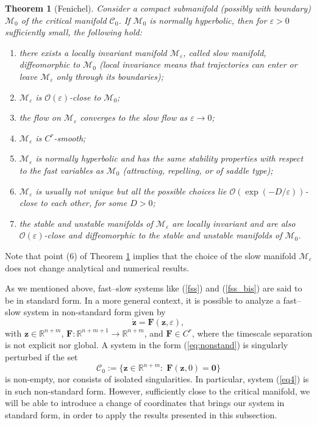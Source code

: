 \documentclass[11pt,reqno]{amsart}
\newtheorem{theorem}{Theorem}
\theoremstyle{boldremark}
\begin{document}
\begin{theorem}[Fenichel] \label{Fen}
    Consider a compact submanifold (possibly with boundary) $\mathcal{M}_0$ of the critical manifold $\mathcal{C}_0$. If $\mathcal{M}_0$ is normally hyperbolic, then for $\varepsilon>0$ sufficiently small, the following hold:
    \begin{enumerate}
        \item there exists a locally invariant manifold $\mathcal{M}_\varepsilon$, called slow manifold,  diffeomorphic to $\mathcal{M}_0$ (local invariance means that trajectories can enter or leave $\mathcal{M}_\varepsilon$ only through its boundaries); 
        \item $\mathcal{M}_\varepsilon$ is $\mathcal{O}(\varepsilon)$-close to $\mathcal{M}_0$; 
        \item the flow on $\mathcal{M}_\varepsilon$ converges to the slow flow as $\varepsilon \to 0$; 
        \item $\mathcal{M}_\varepsilon$ is $C^r$-smooth; 
        \item $\mathcal{M}_\varepsilon$ is normally hyperbolic and has the same stability properties with respect
        to the fast variables as $\mathcal{M}_0$ (attracting, repelling, or of saddle type); 
        \item $\mathcal{M}_\varepsilon$ is usually not unique but all the possible choices lie $\mathcal{O}(\exp(-D/\varepsilon))$-close to
        each other, for some $D > 0$; 
        \item the stable and unstable manifolds of $\mathcal{M}_\varepsilon$ are locally invariant and are also $\mathcal{O}(\varepsilon)$-close and diffeomorphic to the stable and unstable manifolds of $\mathcal{M}_0$. 
    \end{enumerate}
\end{theorem}

Note that point (6) of Theorem \ref{Fen} implies that the choice of the slow manifold $\mathcal{M}_\varepsilon$ does not change analytical and numerical results.

As we mentioned above, fast–slow systems like (\ref{fss}) and (\ref{fss_bis}) are said to be in standard form. In a more general context, it is possible
to analyze a fast–slow system in non-standard form given by \cite{0}
\begin{equation}\label{eq:nonstand}
    \dot{\mathbf{z}} = \mathbf{F}(\mathbf{z},\varepsilon), 
\end{equation}
with $\mathbf{z} \in \mathbb{R}^{n+m}$, $\mathbf{F}\colon \mathbb{R}^{n+m+1} \to \mathbb{R}^{n+m}$, and $\mathbf{F} \in C^r$, where the timescale separation is not explicit nor global. A system in the form (\ref{eq:nonstand}) is singularly perturbed if the set
\begin{equation*}
    \mathcal{C}_0:=\{ \mathbf{z}\in  \mathbb{R}^{n+m} \colon \; \mathbf{F}(\mathbf{z},0)=\mathbf{0}\}
\end{equation*}
is non-empty, nor consists of isolated singularities. In particular, system (\ref{eq4}) is in such non-standard form. However, sufficiently close to the critical manifold, we will be able to introduce a change of coordinates that brings our system in standard form, in order to apply the results presented in this subsection.
\end{document}

